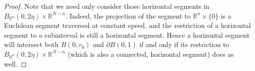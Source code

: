 \documentclass[11pt]{amsart}
\theoremstyle{definition}
\numberwithin{theorem}{section} \numberwithin{equation}{section}
\begin{document}
\begin{proof}
Note that we need only consider those horizontal segments
in $B_{\mathbb{R}^n}(0,2\eta) \times \mathbb{R}^{N-n}$. 
Indeed, the 
projection of the segment to $\mathbb{R}^n \times \{0\}$ is a Euclidean segment traversed at constant speed,
and the restriction of a horizontal segment to a subinterval is still a horizontal segment. %
Hence a horizontal segment will intersect both $B(0,r_0)$ and $\partial B(0,1)$
if and only if 
its restriction to $B_{\mathbb{R}^n}(0,2\eta) \times \mathbb{R}^{N-n}$
(which is also a connected, horizontal segment)
does as well.



\end{proof}
\end{document}
